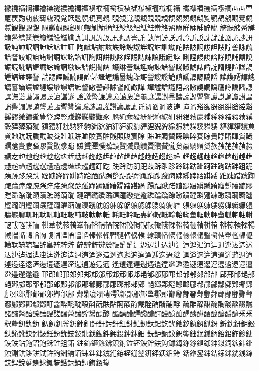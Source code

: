 襒襓襔襕襗襘襙襚襛襜襡襢襣襥襧襨襩襫襭襮襰襱襳襴襵
襶襷襸襹襺襼襽⾑襾覀覂覄覅覇覈覉覊覌覍覎覐覑覒覔覕
覗覙覚覛覜覝覞覟覠覢覣覤覥覧覨覩覫覭覮覰覱観覴覵覶
覸覹覻覼覾觃觍觓觔觕觗觘觙觛觝觟觠觡觢觤觧觨觩觪觬
觭觮觰觱觲觵觷觹觺觻觼觽觾觿訄訅訆訉訋訍訏訑訒訔託
訙訚訜訞訠訡訢訤訦訧訨訩訫訬訮訯訰訲訳訵訷訸訹註証
訽訿詀詂詃詄詅詇詉詊詋詌詍詏詑詓詖詗詙詚詜詝詟詠詤
詥詧詨詪詯詴詶詷詸詺詻詽詾誀誁誂誃誈誋誌誎誏誐誔誖
誗誙誛誜誝誟誢誧誩說誫読誮誯誱誳誴誵誷誸誺誻誽誾諀
諁諃諅諆諈諊諌諎諐諓諔諕諘諙諚諝諟諠諡諣諥諨諩諪諬
諯諰諲諴諵諹諻諽諿謃謆謈謉謋謌謍謏謑謒謓謕謘謜謞謟
謠謢謣謤謥謧謩謪謮謯謰謱謲謴謵謶謷謸謺謻謼謽謿譀譁
譂譃譄譅譆譇譈譊譋譌譍譐譑譒譓譔譕譗譛譝譞譟譠譡譢
譣譤譥譧譨譩譪譭譮譱譲譳譵譶譸譹譺譻譼譾譿讁讂讃讄
讅讆讇讈讉讋讌讍讏讐讑讔讗讘讙讚讛讝讟讬讱讻诇诐诪
谉谞谸谹谺谻谼谽谾谿豀豂豃豄豅豊豋豍豎豏豑豒豓豔豖
豗豘豙豛豜豝豞豟豠豣豤豥豦豧豨豩豬豭豮豯豰豱豲豴豵
豶豷豻豼豽豾豿貀貁貃貄貆貇貈貋貍貎貏貐貑貒貓貕貖貗
貙貚貛貜貟貣貤貥貦貭貮貱貵貹貾賆賉賋賌賍賎賏賐賔賖
賗賘賙賛賝賟賥賨賩賮賯賰賱賲賳賵賶賷賸賹賿贀贁贂贃
贆贇贉贌贎贑贒贓贔贕贗贘贙贚贠赑赒赗赟赥赨赩赪赬赮
赯赱赲赸赹赺赻赼赽赾赿趀趂趃趆趇趈趉趌趍趎趏趐趒趓
趖趗趘趚趛趜趝趞趠趡趢趤趥趦趧趩趪趫趬趭趮趯趰趶趷
趹趻趽跀跁跂跅跇跈跉跊跍跐跒跓跔跕跘跙跜跠跡跢跥跦
跧跩跭跮跰跱跲跴跶跼跾跿踀踁踂踃踄踆踇踈踋踍踎踑踒
踓踕踖踗踘踙踚踛踜踠踡踤踥踦踧踨踫踭踰踲踳踶踷踸踻
踼踾踿蹃蹅蹆蹍蹎蹏蹐蹓蹔蹖蹗蹘蹚蹛蹜蹝蹞蹟蹠蹡蹢蹤
蹥蹧蹨蹪蹫蹮蹱蹳蹵蹷蹸蹹蹻蹽蹾躀躂躃躄躆躈躌躎躕躖
躗躘躙躛躝躟躠躢躣躤躧躨躩躭躮躰躱躳躴躵躶躷躸躹躻
躼躽躾躿軁軂軃軄軅軆軇軈軉軏軐軑軓軕軖軗軘軙軚軜軝
軞軠軡転軣軥軦軧軨軩軪軬軭軮軯軰軱軳軴軵軶軷軽軿輀
輁輂輄輆輈輋輌輍輎輏輐輑輓輖輗輘輙輚輠輡輢輣輤輧輨
輫輬輭輮輰輱輲輴輵輶輷輹輺輼輽轀轁轃轇轈轊轋轌轏轐
轑轒轓轕轖轗轘轙轚轛轜轝轞轠轣轥轪辀辌辒辝辠辡辢辤
辥辧辪辬辳辴⾡辵辷辸辺辻込辿迀迃迆迉迊迋迌迍迏迒迖
迗迚迠迡迣迧迬迯迱迲迵迶迺迻迼迾迿逇逈逌逎逓逘逜逤
逥逧逨逩逪逫逬逰週逳逴逷逹逺逽逿遀遃遅遆遈遉遊遌遖
遙遚遝遟遡遤遦遧遪遫遬遯遰遱遳遶遹遻遾邅邆邉邌邍邎
邒邔邖邘邚邜邞邟邠邤邥邧邨邩邫邭邲邷邼邽邿郀郂郃郆
郈郉郋郌郍郒郔郕郖郘郙郚郞郠郣郤郥郩郪郬郮郰郱郲郳
郶郷郹郺郻郼郿鄀鄁鄃鄅鄇鄈鄊鄋鄌鄍鄎鄏鄐鄑鄓鄕鄗鄘
鄚鄛鄜鄝鄟鄠鄡鄤鄥鄦鄨鄩鄪鄫鄬鄮鄳鄵鄷鄸鄻鄼鄽鄾鄿
酀酁酂酄酅酇酑酓酔酕酖酘酙酛酜酟酠酦酧酨酫酭酳酺酻
酼醀醁醂醃醄醆醈醊醎醏醓醔醕醗醘醙醝醞醟醠醡醤醥醦
醧醨醩醰醱醲醳醶醷醸醹醻醼醽醾醿釂釄⾤釆釈釐釖釚釛
釞釟釠釡釢釥釦釨釪釫釬釭釮釯釰釱釲釳釴釶釸釻釼釽釾
釿鈂鈃鈅鈆鈇鈊鈋鈌鈏鈒鈓鈖鈗鈘鈙鈚鈛鈜鈝鈟鈠鈡鈢鈤
鈨鈩鈪鈫鈬鈭鈯鈱鈲鈵鈶鈻鈼鉁鉂鉃鉄鉆鉇鉊鉋鉌鉎鉏鉐
鉒鉓鉔鉖鉘鉙鉜鉝鉟鉠鉡鉣鉤鉥鉧鉨鉩鉪鉫鉮鉯鉰鉱鉲鉳
鉵鉶鉷鉹鉼鉽鉾銁銂銄銆銇銈銉銊銋銌銍銏銐銒銔銕銗銙
銛銝銞銟銡銢銤銧銭銯銰銲銳銴銵銶銸銺銽銾銿鋀鋂鋄鋆

